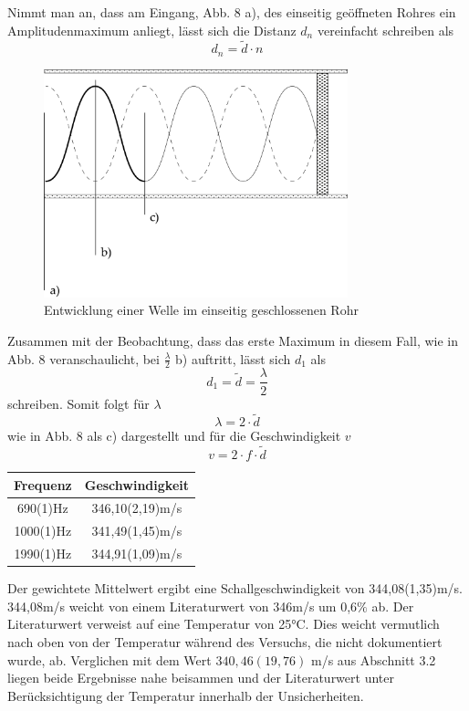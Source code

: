 \documentclass{article}
\begin{document}
Nimmt man an, dass am Eingang, Abb. 8 a), des einseitig geöffneten Rohres ein Amplitudenmaximum anliegt, lässt sich die Distanz $d_n$ vereinfacht schreiben als
\begin{equation}
d_n = \widetilde{d} \cdot n
\end{equation}
\begin{figure}[hbt!]
\centering
\includegraphics[width = 250pt]{WellenRohr.png}
\caption{Entwicklung einer Welle im einseitig geschlossenen Rohr}
\end{figure}
Zusammen mit der Beobachtung, dass das erste Maximum in diesem Fall, wie in Abb. 8 veranschaulicht, bei $\frac{\lambda}{2}$ b) auftritt, lässt sich $d_1$ als
\begin{equation}
d_1 = \widetilde{d} = \frac{\lambda}{2}
\end{equation}
schreiben. Somit folgt für $\lambda$
\begin{equation}
\lambda = 2 \cdot \widetilde{d}
\end{equation}
wie in Abb. 8 als c) dargestellt und für die Geschwindigkeit $v$
\begin{equation}
v = 2 \cdot f \cdot \widetilde{d}
\end{equation}

\begin{center}
\begin{tabular}{|c|c|}
\hline 
Frequenz & Geschwindigkeit \\ 
\hline 
690(1)Hz & 346,10(2,19)m/s \\ 
\hline 
1000(1)Hz & 341,49(1,45)m/s \\ 
\hline 
1990(1)Hz & 344,91(1,09)m/s \\ 
\hline 
\end{tabular} 
\end{center}
Der gewichtete Mittelwert ergibt eine Schallgeschwindigkeit von 344,08(1,35)m/s. 344,08m/s weicht von einem Literaturwert \cite{2} von 346m/s um 0,6$\%$ ab. Der Literaturwert verweist auf eine Temperatur von 25°C. Dies weicht vermutlich nach oben von der Temperatur während des Versuchs, die nicht dokumentiert wurde, ab.
Verglichen mit dem Wert $340,46(19,76)$ m/s aus Abschnitt 3.2 liegen beide Ergebnisse nahe beisammen und der Literaturwert unter Berücksichtigung der Temperatur innerhalb der Unsicherheiten. 
\end{document}
